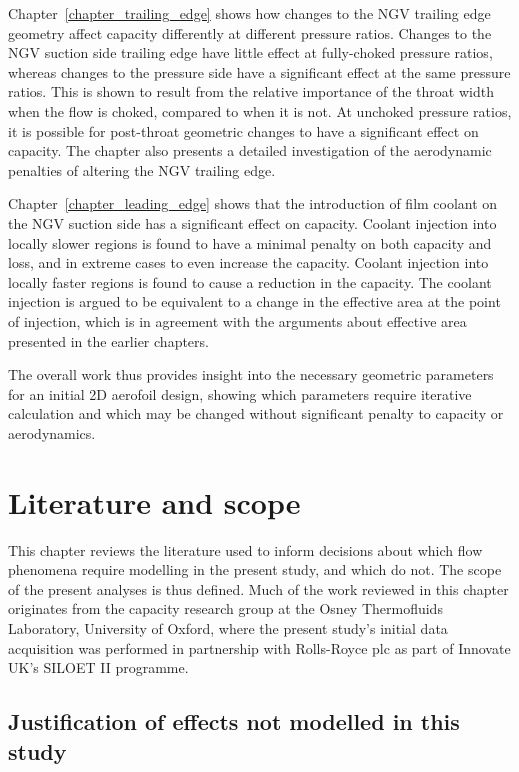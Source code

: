 \documentclass[a4paper, 11pt, oneside]{report}
\begin{document}
Chapter~\ref{chapter_trailing_edge} shows how changes to the NGV trailing edge geometry affect capacity differently at different pressure ratios. Changes to the NGV suction side trailing edge have little effect at fully-choked pressure ratios, whereas changes to the pressure side have a significant effect at the same pressure ratios. This is shown to result from the relative importance of the throat width when the flow is choked, compared to when it is not. At unchoked pressure ratios, it is possible for post-throat geometric changes to have a significant effect on capacity. The chapter also presents a detailed investigation of the aerodynamic penalties of altering the NGV trailing edge.

Chapter~\ref{chapter_leading_edge} shows that the introduction of film coolant on the NGV suction side has a significant effect on capacity. Coolant injection into locally slower regions is found to have a minimal penalty on both capacity and loss, and in extreme cases to even increase the capacity. Coolant injection into locally faster regions is found to cause a reduction in the capacity. The coolant injection is argued to be equivalent to a change in the effective area at the point of injection, which is in agreement with the arguments about effective area presented in the earlier chapters.

\newpage The overall work thus provides insight into the necessary geometric parameters for an initial 2D aerofoil design, showing which parameters require iterative calculation and which may be changed without significant penalty to capacity or aerodynamics.



\chapter{Literature and scope}
\label{chapter_literature_and_scope}

This chapter reviews the literature used to inform decisions about which flow phenomena require modelling in the present study, and which do not. The scope of the present analyses is thus defined. Much of the work reviewed in this chapter originates from the capacity research group at the Osney Thermofluids Laboratory, University of Oxford, where the present study's initial data acquisition was performed in partnership with Rolls-Royce plc as part of Innovate UK's SILOET II programme.


\section{Justification of effects not modelled in this study}
\label{justification_of_effects_not_modelled_in_this_study}
\end{document}
